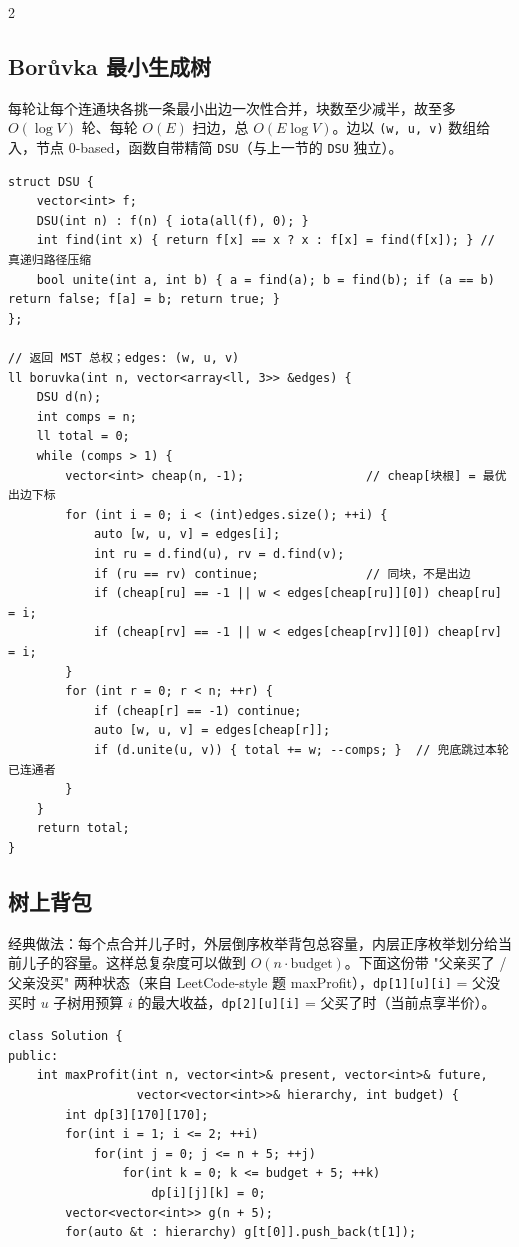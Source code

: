\begin{multicols*}{2}
		\subsection{Borůvka 最小生成树}

		每轮让每个连通块各挑一条最小出边一次性合并，块数至少减半，故至多 $O(\log V)$ 轮、每轮 $O(E)$ 扫边，总 $O(E\log V)$。边以 \texttt{(w, u, v)} 数组给入，节点 0-based，函数自带精简 \texttt{DSU}（与上一节的 \texttt{DSU} 独立）。

		\begin{verbatim}
struct DSU {
    vector<int> f;
    DSU(int n) : f(n) { iota(all(f), 0); }
    int find(int x) { return f[x] == x ? x : f[x] = find(f[x]); } // 真递归路径压缩
    bool unite(int a, int b) { a = find(a); b = find(b); if (a == b) return false; f[a] = b; return true; }
};

// 返回 MST 总权；edges: (w, u, v)
ll boruvka(int n, vector<array<ll, 3>> &edges) {
    DSU d(n);
    int comps = n;
    ll total = 0;
    while (comps > 1) {
        vector<int> cheap(n, -1);                 // cheap[块根] = 最优出边下标
        for (int i = 0; i < (int)edges.size(); ++i) {
            auto [w, u, v] = edges[i];
            int ru = d.find(u), rv = d.find(v);
            if (ru == rv) continue;               // 同块，不是出边
            if (cheap[ru] == -1 || w < edges[cheap[ru]][0]) cheap[ru] = i;
            if (cheap[rv] == -1 || w < edges[cheap[rv]][0]) cheap[rv] = i;
        }
        for (int r = 0; r < n; ++r) {
            if (cheap[r] == -1) continue;
            auto [w, u, v] = edges[cheap[r]];
            if (d.unite(u, v)) { total += w; --comps; }  // 兜底跳过本轮已连通者
        }
    }
    return total;
}
		\end{verbatim}


		\subsection{树上背包}

		经典做法：每个点合并儿子时，外层倒序枚举背包总容量，内层正序枚举划分给当前儿子的容量。这样总复杂度可以做到 $O(n \cdot \mathrm{budget})$。下面这份带 "父亲买了 / 父亲没买" 两种状态（来自 LeetCode-style 题 maxProfit），\texttt{dp[1][u][i]} = 父没买时 $u$ 子树用预算 $i$ 的最大收益，\texttt{dp[2][u][i]} = 父买了时（当前点享半价）。

		\begin{verbatim}
class Solution {
public:
    int maxProfit(int n, vector<int>& present, vector<int>& future,
                  vector<vector<int>>& hierarchy, int budget) {
        int dp[3][170][170];
        for(int i = 1; i <= 2; ++i)
            for(int j = 0; j <= n + 5; ++j)
                for(int k = 0; k <= budget + 5; ++k)
                    dp[i][j][k] = 0;
        vector<vector<int>> g(n + 5);
        for(auto &t : hierarchy) g[t[0]].push_back(t[1]);


\end{verbatim}
\end{multicols*}
